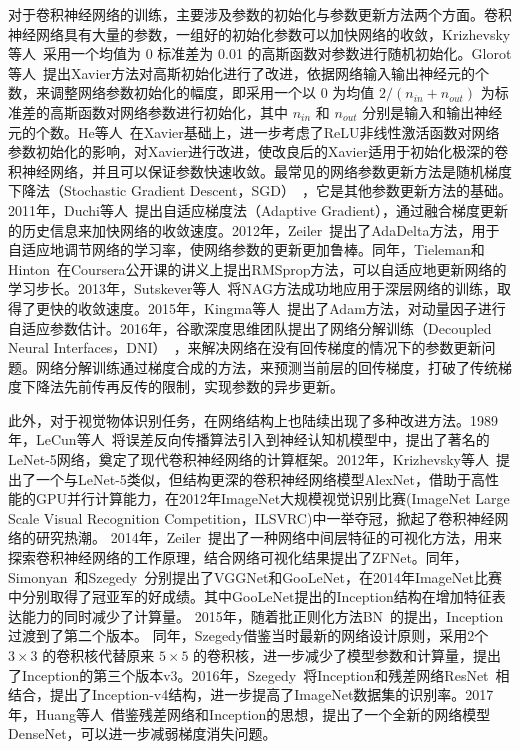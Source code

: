 对于卷积神经网络的训练，主要涉及参数的初始化与参数更新方法两个方面。卷积神经网络具有大量的参数，一组好的初始化参数可以加快网络的收敛，Krizhevsky等人~\cite{krizhevsky2012imagenet}采用一个均值为 0 标准差为 0.01 的高斯函数对参数进行随机初始化。Glorot等人~\cite{glorot2010understanding}提出Xavier方法对高斯初始化进行了改进，依据网络输入输出神经元的个数，来调整网络参数初始化的幅度，即采用一个以 0 为均值 $2/(n_{in}+n_{out})$ 为标准差的高斯函数对网络参数进行初始化，其中 $n_{in}$ 和 $n_{out}$ 分别是输入和输出神经元的个数。He等人~\cite{he2015delving}在Xavier基础上，进一步考虑了ReLU非线性激活函数对网络参数初始化的影响，对Xavier进行改进，使改良后的Xavier适用于初始化极深的卷积神经网络，并且可以保证参数快速收敛。最常见的网络参数更新方法是随机梯度下降法（Stochastic Gradient Descent，SGD）~\cite{bottou2012stochastic}，它是其他参数更新方法的基础。2011年，Duchi等人~\cite{duchi2011adaptive}提出自适应梯度法（Adaptive Gradient），通过融合梯度更新的历史信息来加快网络的收敛速度。2012年，Zeiler~\cite{zeiler2012adadelta}提出了AdaDelta方法，用于自适应地调节网络的学习率，使网络参数的更新更加鲁棒。同年，Tieleman和Hinton~\cite{tieleman2012}在Coursera公开课的讲义上提出RMSprop方法，可以自适应地更新网络的学习步长。2013年，Sutskever等人~\cite{sutskever2013importance}将NAG方法成功地应用于深层网络的训练，取得了更快的收敛速度。2015年，Kingma等人~\cite{kingma2014adam}提出了Adam方法，对动量因子进行自适应参数估计。2016年，谷歌深度思维团队提出了网络分解训练（Decoupled Neural Interfaces，DNI）~\cite{jaderberg2016decoupled}，来解决网络在没有回传梯度的情况下的参数更新问题。网络分解训练通过梯度合成的方法，来预测当前层的回传梯度，打破了传统梯度下降法先前传再反传的限制，实现参数的异步更新。

此外，对于视觉物体识别任务，在网络结构上也陆续出现了多种改进方法。1989年，LeCun等人~\cite{lecun1989backpropagation,le1990handwritten}将误差反向传播算法引入到神经认知机模型中，提出了著名的LeNet-5网络，奠定了现代卷积神经网络的计算框架。2012年，Krizhevsky等人~\cite{krizhevsky2012imagenet}提出了一个与LeNet-5类似，但结构更深的卷积神经网络模型AlexNet，借助于高性能的GPU并行计算能力，在2012年ImageNet大规模视觉识别比赛(ImageNet Large Scale Visual Recognition Competition，ILSVRC)中一举夺冠，掀起了卷积神经网络的研究热潮。
2014年，Zeiler~\cite{zeiler2014visualizing}提出了一种网络中间层特征的可视化方法，用来探索卷积神经网络的工作原理，结合网络可视化结果提出了ZFNet。同年，Simonyan~\cite{simonyan2014very}和Szegedy~\cite{szegedy2014going}分别提出了VGGNet和GooLeNet，在2014年ImageNet比赛中分别取得了冠亚军的好成绩。其中GooLeNet提出的Inception结构在增加特征表达能力的同时减少了计算量。
2015年，随着批正则化方法BN~\cite{ioffe2015batch}的提出，Inception过渡到了第二个版本。
同年，Szegedy借鉴当时最新的网络设计原则，采用2个 $3\times3$ 的卷积核代替原来 $5\times5$ 的卷积核，进一步减少了模型参数和计算量，提出了Inception的第三个版本v3。2016年，Szegedy~\cite{szegedy2016inception}将Inception和残差网络ResNet~\cite{he2015deep}相结合，提出了Inception-v4结构，进一步提高了ImageNet数据集的识别率。2017年，Huang等人~\cite{huang2016densely}借鉴残差网络和Inception的思想，提出了一个全新的网络模型DenseNet，可以进一步减弱梯度消失问题。



